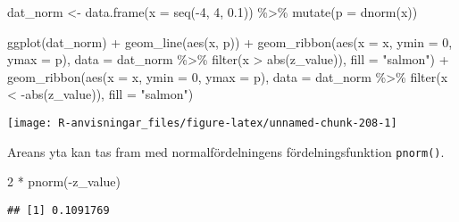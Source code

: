 \documentclass[
]{book}
\newenvironment{Shaded}{\begin{snugshade}}{\end{snugshade}}
\newcommand{\AttributeTok}[1]{\textcolor[rgb]{0.77,0.63,0.00}{#1}}
\newcommand{\DecValTok}[1]{\textcolor[rgb]{0.00,0.00,0.81}{#1}}
\newcommand{\FloatTok}[1]{\textcolor[rgb]{0.00,0.00,0.81}{#1}}
\newcommand{\FunctionTok}[1]{\textcolor[rgb]{0.00,0.00,0.00}{#1}}
\newcommand{\NormalTok}[1]{#1}
\newcommand{\OtherTok}[1]{\textcolor[rgb]{0.56,0.35,0.01}{#1}}
\newcommand{\SpecialCharTok}[1]{\textcolor[rgb]{0.00,0.00,0.00}{#1}}
\newcommand{\StringTok}[1]{\textcolor[rgb]{0.31,0.60,0.02}{#1}}
\theoremstyle{definition}
\theoremstyle{definition}
\theoremstyle{definition}
\theoremstyle{definition}
\theoremstyle{remark}
\begin{document}
\begin{Shaded}
\begin{Highlighting}[]
\NormalTok{dat\_norm }\OtherTok{\textless{}{-}} \FunctionTok{data.frame}\NormalTok{(}\AttributeTok{x =} \FunctionTok{seq}\NormalTok{(}\SpecialCharTok{{-}}\DecValTok{4}\NormalTok{, }\DecValTok{4}\NormalTok{, }\FloatTok{0.1}\NormalTok{)) }\SpecialCharTok{\%\textgreater{}\%} 
  \FunctionTok{mutate}\NormalTok{(}\AttributeTok{p =} \FunctionTok{dnorm}\NormalTok{(x))}

\FunctionTok{ggplot}\NormalTok{(dat\_norm) }\SpecialCharTok{+}
  \FunctionTok{geom\_line}\NormalTok{(}\FunctionTok{aes}\NormalTok{(x, p)) }\SpecialCharTok{+}
  \FunctionTok{geom\_ribbon}\NormalTok{(}\FunctionTok{aes}\NormalTok{(}\AttributeTok{x =}\NormalTok{ x, }\AttributeTok{ymin =} \DecValTok{0}\NormalTok{, }\AttributeTok{ymax =}\NormalTok{ p), }\AttributeTok{data =}\NormalTok{ dat\_norm }\SpecialCharTok{\%\textgreater{}\%} \FunctionTok{filter}\NormalTok{(x }\SpecialCharTok{\textgreater{}} \FunctionTok{abs}\NormalTok{(z\_value)), }\AttributeTok{fill =} \StringTok{"salmon"}\NormalTok{) }\SpecialCharTok{+}
  \FunctionTok{geom\_ribbon}\NormalTok{(}\FunctionTok{aes}\NormalTok{(}\AttributeTok{x =}\NormalTok{ x, }\AttributeTok{ymin =} \DecValTok{0}\NormalTok{, }\AttributeTok{ymax =}\NormalTok{ p), }\AttributeTok{data =}\NormalTok{ dat\_norm }\SpecialCharTok{\%\textgreater{}\%} \FunctionTok{filter}\NormalTok{(x }\SpecialCharTok{\textless{}} \SpecialCharTok{{-}}\FunctionTok{abs}\NormalTok{(z\_value)), }\AttributeTok{fill =} \StringTok{"salmon"}\NormalTok{)}
\end{Highlighting}
\end{Shaded}

\begin{center}\texttt{[image: R-anvisningar\_files/figure-latex/unnamed-chunk-208-1]} \end{center}

Areans yta kan tas fram med normalfördelningens fördelningsfunktion \texttt{pnorm()}.

\begin{Shaded}
\begin{Highlighting}[]
\DecValTok{2} \SpecialCharTok{*} \FunctionTok{pnorm}\NormalTok{(}\SpecialCharTok{{-}}\NormalTok{z\_value)}
\end{Highlighting}
\end{Shaded}

\begin{verbatim}
## [1] 0.1091769
\end{verbatim}
\end{document}
